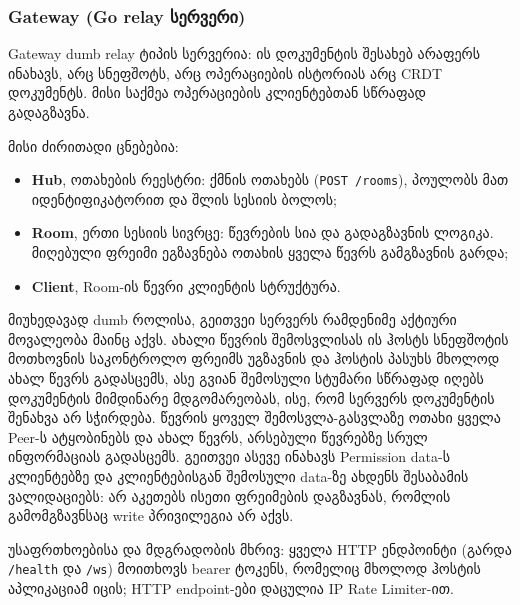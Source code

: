 \subsubsection{Gateway (Go relay სერვერი)}

Gateway dumb relay ტიპის სერვერია: ის დოკუმენტის შესახებ
არაფერს ინახავს, არც სნეფშოტს, არც ოპერაციების ისტორიას არც CRDT
დოკუმენტს. მისი საქმეა ოპერაციების კლიენტებთან სწრაფად გადაგზავნა. 

მისი ძირითადი ცნებებია:
\begin{itemize}[itemsep=0pt]
  \item \textbf{Hub}, ოთახების რეესტრი: ქმნის ოთახებს (\texttt{POST
        /rooms}), პოულობს მათ იდენტიფიკატორით და შლის სესიის ბოლოს;
  \item \textbf{Room}, ერთი სესიის სივრცე: წევრების სია და გადაგზავნის
        ლოგიკა. მიღებული ფრეიმი ეგზავნება ოთახის ყველა წევრს გამგზავნის
        გარდა;
  \item \textbf{Client}, Room-ის წევრი კლიენტის სტრუქტურა. 
\end{itemize}

მიუხედავად dumb როლისა, გეითვეი სერვერს რამდენიმე აქტიური მოვალეობა მაინც
აქვს. ახალი წევრის შემოსვლისას ის ჰოსტს სნეფშოტის მოთხოვნის საკონტროლო
ფრეიმს უგზავნის და ჰოსტის პასუხს მხოლოდ ახალ წევრს გადასცემს, ასე
გვიან შემოსული სტუმარი სწრაფად იღებს დოკუმენტის მიმდინარე მდგომარეობას,
ისე, რომ სერვერს დოკუმენტის შენახვა არ სჭირდება. წევრის ყოველ
შემოსვლა-გასვლაზე ოთახი ყველა Peer-ს ატყობინებს და ახალ წევრს, არსებული წევრებზე სრულ ინფორმაციას გადასცემს.
გეითვეი ასევე ინახავს Permission data-ს კლიენტებზე და კლიენტებისგან შემოსული data-ზე ახდენს შესაბამის ვალიდაციებს:
არ აკეთებს ისეთი ფრეიმების დაგზავნას, რომლის გამომგზავნსაც write პრივილეგია არ აქვს.

უსაფრთხოებისა და მდგრადობის მხრივ: ყველა HTTP ენდპოინტი (გარდა
\texttt{/health} და \texttt{/ws}) მოითხოვს bearer ტოკენს, რომელიც მხოლოდ
ჰოსტის აპლიკაციამ იცის; HTTP endpoint-ები დაცულია IP Rate Limiter-ით. 
